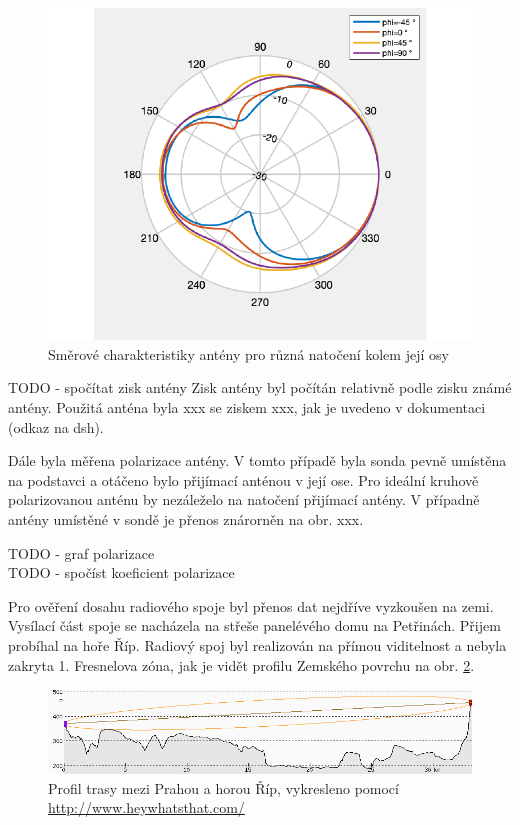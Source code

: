 \documentclass[twoside]{ctuthesis}
\theoremstyle{plain}
\theoremstyle{definition}
\theoremstyle{note}
\begin{document}
	\begin{figure}[hbtp]
		\centering
		\includegraphics[width=.5\textwidth]{Graphs/radiation_plot.pdf}
		\caption{Směrové charakteristiky antény pro různá natočení kolem její osy}
		\label{graph:radiation:char}
	\end{figure}

	TODO - spočítat zisk antény
	Zisk antény byl počítán relativně podle zisku známé antény. Použitá anténa byla xxx se ziskem xxx, jak je uvedeno v dokumentaci (odkaz na dsh).

	Dále byla měřena polarizace antény. V tomto případě byla sonda pevně umístěna na podstavci a otáčeno bylo přijímací anténou v její ose. Pro ideální kruhově polarizovanou anténu by nezáleželo na natočení přijímací antény. V případně antény umístěné v sondě je přenos znárorněn na obr. xxx.

	TODO - graf polarizace\\
	TODO - spočíst koeficient polarizace

	Pro ověření dosahu radiového spoje byl přenos dat nejdříve vyzkoušen na zemi. Vysílací část spoje se nacházela na střeše panelévého domu na Petřinách. Přijem probíhal na hoře Říp. Radiový spoj byl realizován na přímou viditelnost a nebyla zakryta 1. Fresnelova zóna, jak je vidět profilu Zemského povrchu na obr. \ref{fig:praha:rip}.

	\begin{figure}[hbtp]
		\centering
		\includegraphics[width=\textwidth]{Figures/petriny_rip.png}
		\caption{Profil trasy mezi Prahou a horou Říp, vykresleno pomocí \url{http://www.heywhatsthat.com/}}
		\label{fig:praha:rip}
	\end{figure}
\end{document}
